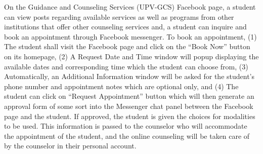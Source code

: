 On the Guidance and Counseling Services (UPV-GCS) Facebook page, a student can view posts regarding available services as well as programs from other institutions that offer other counseling services and, a student can inquire and book an appointment through Facebook messenger. To book an appointment, (1) The student shall visit the Facebook page and click on the “Book Now” button on its homepage, (2) A Request Date and Time window will popup displaying the available dates and corresponding time which the student can choose from, (3) Automatically, an Additional Information window will be asked for the student’s phone number and appointment notes which are optional only, and (4) The student can click on “Request Appointment” button which will then generate an approval form of some sort into the Messenger chat panel between the Facebook page and the student. If approved, the student is given the choices for modalities to be used. This information is passed to the counselor who will accommodate the appointment of the student, and the online counseling will be taken care of by the counselor in their personal account. 
   


  




